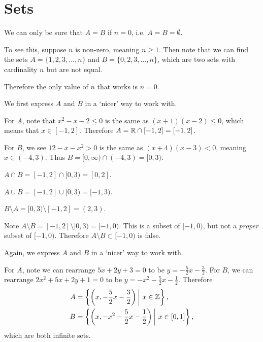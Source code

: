 \section{Sets}
\begin{questions}
    \item We can only be sure that $A = B$ if $n = 0$, i.e. $A = B = \emptyset$.
    
    To see this, suppose $n$ is non-zero, meaning $n \geq 1$. Then note that we can find the sets $A = \{1, 2, 3, \dots, n\}$ and $B = \{0, 2, 3, \dots, n\}$, which are two sets with cardinality $n$ but are not equal.

    Therefore the only value of $n$ that works is $n = 0$.

    \item We first express $A$ and $B$ in a `nicer' way to work with.
    
    For $A$, note that $x^2 - x - 2 \leq 0$ is the same as $(x+1)(x-2) \leq 0$, which means that $x \in [-1, 2]$. Therefore $A = \mathbb{R} \cap [-1, 2] = [-1, 2]$.

    For $B$, we see $12 - x - x^2 > 0$ is the same as $(x+4)(x-3) < 0$, meaning $x \in (-4, 3)$. Thus $B = [0, \infty) \cap (-4, 3) = [0, 3)$.

    \begin{partquestions}{\alph*}
        \item $A \cap B = [-1, 2] \cap [0, 3) = [0, 2]$.
        \item $A \cup B = [-1, 2] \cup [0, 3) = [-1, 3)$.
        \item $B \setminus A = [0, 3) \setminus [-1, 2] = (2, 3)$.
        \item Note $A \setminus B = [-1, 2] \setminus [0, 3) = [-1, 0)$. This is a subset of $[-1, 0)$, but not a \textit{proper} subset of $[-1, 0)$. Therefore $A\setminus B \subset [-1, 0)$ is false.
    \end{partquestions}

    \item Again, we express $A$ and $B$ in a `nicer' way to work with.
    
    For $A$, note we can rearrange $5x+2y+3=0$ to be $y=-\frac52x-\frac32$. For $B$, we can rearrange $2x^2+5x+2y+1=0$ to be $y=-x^2-\frac52x-\frac12$. Therefore
    \begin{align*}
        A &= \left\{\left(x, -\frac52x-\frac32\right) \vert x \in \Z \right\},\\
        B &= \left\{\left(x, -x^2-\frac52x-\frac12\right) \vert x \in [0, 1] \right\},
    \end{align*}
    which are both infinite sets.


\end{questions}

